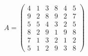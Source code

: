 \documentclass[12pt]{article}
\begin{document}
$ \begin{equation*}   A =     \begin{pmatrix}    4 & 1 & 3 & 8 & 4 & 5 \\    9 & 2 & 8 & 9 & 2 & 7 \\    5 & 5 & 4 & 3 & 2 & 5 \\    8 & 2 & 9 & 1 & 9 & 8 \\ 7 & 1 & 3 & 2 & 1 & 2 \\ 5 & 1 & 2 & 9 & 3 & 8    \end{pmatrix}    \end{equation*} $
\end{document}
